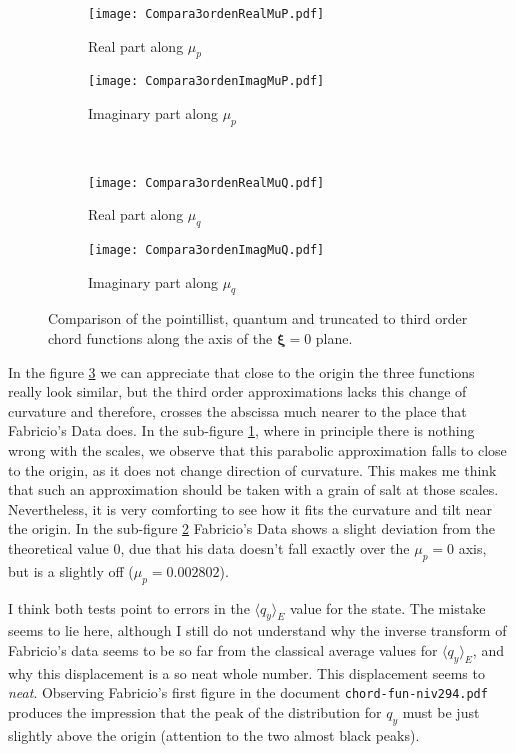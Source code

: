 \documentclass[a4paper,12pt]{article}
\newcommand{\xifase}{ {\boldsymbol{\xi}} }
\newcommand{\Prom}[2]{\langle #1\rangle_{#2}}
\begin{document}
\begin{figure}[h]
  \centering     
  \begin{subfigure}[b]{0.45\textwidth}
    \centering
    \texttt{[image: Compara3ordenRealMuP.pdf]}
    \caption{Real part along $\mu_p$}
   \end{subfigure}%
  \begin{subfigure}[b]{0.45\textwidth}
    \centering
    \texttt{[image: Compara3ordenImagMuP.pdf]}
    \caption{Imaginary part along $\mu_p$}
  \end{subfigure}\\
   \begin{subfigure}[b]{0.45\textwidth}
    \centering
    \texttt{[image: Compara3ordenRealMuQ.pdf]}
    \caption{Real part along $\mu_q$}
    \label{real3ordenmuq}
   \end{subfigure}%
  \begin{subfigure}[b]{0.45\textwidth}
    \centering
    \texttt{[image: Compara3ordenImagMuQ.pdf]}
    \caption{Imaginary part along $\mu_q$}
    \label{imag3ordenmuq}
  \end{subfigure}
  \caption{Comparison of the pointillist, quantum and truncated to third order
chord functions along the axis of the $\xifase=0$ plane. }
  \label{compara3orden}
\end{figure}

In the figure \ref{compara3orden} we can appreciate that close to the origin the
three functions really look similar, but the third order approximations lacks
this change of curvature and therefore, crosses the abscissa much nearer
to the place that Fabricio's Data does. In the sub-figure \ref{real3ordenmuq},
where in principle there is nothing wrong with the scales, we observe that
this parabolic approximation falls to close to the origin, as it does not
change direction of curvature. This makes me think that such an approximation
should be taken with a grain of salt at those scales. Nevertheless, it is very
comforting to see how it fits the curvature and tilt near the origin. 
In the sub-figure \ref{imag3ordenmuq} Fabricio's Data shows a slight deviation
from the theoretical value $0$, due that his data doesn't fall exactly over the
$\mu_p=0$ axis, but is a slightly off ($\mu_p =0.002802$).  

I think both tests point to errors in the $\Prom{q_y}{E}$ value for the state.
The mistake seems to lie here, although I still do not understand why the inverse
transform of Fabricio's data seems to be so far from the classical 
average values for $\Prom{q_y}{E}$, and why this displacement is
a so neat whole number. This displacement seems to \emph{neat}. Observing Fabricio's
first figure in the document \verb|chord-fun-niv294.pdf| produces
the impression that the peak of the distribution for $q_y$ must be just slightly above
the origin (attention to the two almost black peaks). 
\end{document}
